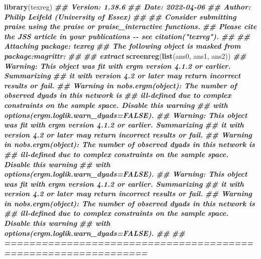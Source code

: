 \documentclass[
]{book}
\newenvironment{Shaded}{\begin{snugshade}}{\end{snugshade}}
\newcommand{\DocumentationTok}[1]{\textcolor[rgb]{0.56,0.35,0.01}{\textbf{\textit{#1}}}}
\newcommand{\FunctionTok}[1]{\textcolor[rgb]{0.13,0.29,0.53}{\textbf{#1}}}
\newcommand{\NormalTok}[1]{#1}
\begin{document}
\begin{Shaded}
\begin{Highlighting}[]
\FunctionTok{library}\NormalTok{(texreg)}
\DocumentationTok{\#\# Version:  1.38.6}
\DocumentationTok{\#\# Date:     2022{-}04{-}06}
\DocumentationTok{\#\# Author:   Philip Leifeld (University of Essex)}
\DocumentationTok{\#\# }
\DocumentationTok{\#\# Consider submitting praise using the praise or praise\_interactive functions.}
\DocumentationTok{\#\# Please cite the JSS article in your publications {-}{-} see citation("texreg").}
\DocumentationTok{\#\# }
\DocumentationTok{\#\# Attaching package: \textquotesingle{}texreg\textquotesingle{}}
\DocumentationTok{\#\# The following object is masked from \textquotesingle{}package:magrittr\textquotesingle{}:}
\DocumentationTok{\#\# }
\DocumentationTok{\#\#     extract}
\FunctionTok{screenreg}\NormalTok{(}\FunctionTok{list}\NormalTok{(ans0, ans1, ans2))}
\DocumentationTok{\#\# Warning: This object was fit with \textquotesingle{}ergm\textquotesingle{} version 4.1.2 or earlier. Summarizing}
\DocumentationTok{\#\# it with version 4.2 or later may return incorrect results or fail.}
\DocumentationTok{\#\# Warning in nobs.ergm(object): The number of observed dyads in this network is}
\DocumentationTok{\#\# ill{-}defined due to complex constraints on the sample space. Disable this warning}
\DocumentationTok{\#\# with \textquotesingle{}options(ergm.loglik.warn\_dyads=FALSE)\textquotesingle{}.}
\DocumentationTok{\#\# Warning: This object was fit with \textquotesingle{}ergm\textquotesingle{} version 4.1.2 or earlier. Summarizing}
\DocumentationTok{\#\# it with version 4.2 or later may return incorrect results or fail.}
\DocumentationTok{\#\# Warning in nobs.ergm(object): The number of observed dyads in this network is}
\DocumentationTok{\#\# ill{-}defined due to complex constraints on the sample space. Disable this warning}
\DocumentationTok{\#\# with \textquotesingle{}options(ergm.loglik.warn\_dyads=FALSE)\textquotesingle{}.}
\DocumentationTok{\#\# Warning: This object was fit with \textquotesingle{}ergm\textquotesingle{} version 4.1.2 or earlier. Summarizing}
\DocumentationTok{\#\# it with version 4.2 or later may return incorrect results or fail.}
\DocumentationTok{\#\# Warning in nobs.ergm(object): The number of observed dyads in this network is}
\DocumentationTok{\#\# ill{-}defined due to complex constraints on the sample space. Disable this warning}
\DocumentationTok{\#\# with \textquotesingle{}options(ergm.loglik.warn\_dyads=FALSE)\textquotesingle{}.}
\DocumentationTok{\#\# }
\DocumentationTok{\#\# ===============================================================}

\end{Highlighting}
\end{Shaded}
\end{document}
